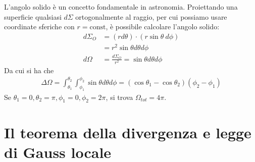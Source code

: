 \documentclass[a4paper, oneside]{book}
\begin{document}
L'angolo solido è un concetto fondamentale in astronomia. Proiettando una 
superficie qualsiasi $d\Sigma$ ortogonalmente al raggio, per cui possiamo usare
coordinate sferiche con $r = \text{const}$, è possibile calcolare l'angolo solido:
\begin{align*}
    d\Sigma_O &= (rd\theta) \cdot (r\sin\theta \ d\phi) \\
    &= r^{2} \sin\theta d\theta d\phi \\
    d\Omega &= \frac{d\Sigma_O}{r^{2}} = \sin\theta d\theta d\phi 
\end{align*}
Da cui si ha che
\begin{gather*}
    \Delta \Omega = \int_{\theta_1}^{\theta_2} \int_{\phi_1}^{\phi_2} \sin\theta d\theta d\phi = (\cos\theta_1 - \cos\theta_2) (\phi_2 - \phi_1)  
\end{gather*}
Se $\theta_1 = 0, \theta_2 = \pi, \phi_1 = 0, \phi_2 = 2\pi$, si trova $\Omega_{tot} = 4\pi$.

\section{Il teorema della divergenza e legge di Gauss locale}
\end{document}
